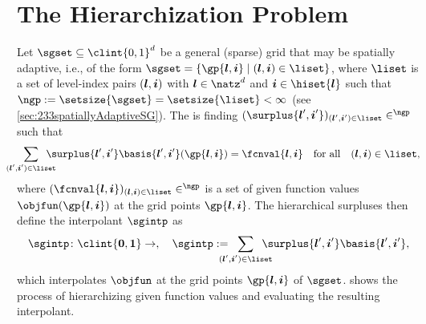 \section{The Hierarchization Problem}
\label{sec:41problem}

Let $\sgset \subset \clint{0, 1}^d$ be a general (sparse) grid that
may be spatially adaptive, i.e.,
of the form $\sgset = \{\gp{\*l,\*i} \mid (\*l, \*i) \in \liset\}$,
where $\liset$ is a set of level-index pairs $({\boldsymbol{l}}, {\boldsymbol{i}})$ with $\*l \in \natz^d$
and $\*i \in \hiset{\*l}$ such that
$\ngp := \setsize{\sgset} = \setsize{\liset} < \infty$
(see \cref{sec:233spatiallyAdaptiveSG}).
The  is finding
$(\surplus{\*l',\*i'})_{(\*l',\*i') \in \liset} \in \real^{\ngp}$ such that
\begin{equation}
  \label{eq:hierarchizationProblem}
  \largesum{(\*l', \*i') \in \liset} \surplus{\*l',\*i'}
  \basis{\*l',\*i'}(\gp{\*l,\*i}) = \fcnval{\*l,\*i}
  \quad\text{for all}\quad
  (\*l, \*i) \in \liset,
\end{equation}
where $(\fcnval{\*l,\*i})_{(\*l,\*i) \in \liset} \in \real^{\ngp}$ is a set of
given function values $\objfun(\gp{\*l,\*i})$
at the grid points $\gp{\*l,\*i}$.
The hierarchical surpluses then define the interpolant $\sgintp$ as
\begin{equation}
  \label{eq:hierarchizationInterpolant}
  \sgintp\colon \clint{\*0, \*1} \to \real,\quad
  \sgintp :=
  \largesum{(\*l', \*i') \in \liset} \surplus{\*l',\*i'}
  \basis{\*l',\*i'},
\end{equation}
which interpolates $\objfun$ at the grid points $\gp{\*l,\*i}$ of $\sgset$.
 shows the process of hierarchizing given
function values and evaluating the resulting interpolant.

